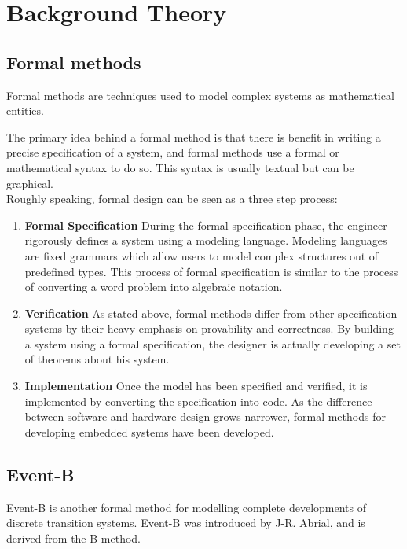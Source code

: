 \section{Background Theory}

\subsection{Formal methods}
Formal methods are techniques used to model complex systems as
mathematical entities.

The primary idea behind a formal method is that there is benefit in writing a
precise specification of a system, and formal methods use a formal or
mathematical syntax to do so. This syntax is usually textual but can be
graphical. \\

Roughly speaking, formal design can be seen as a three step process:
\begin{enumerate}
\item \textbf{Formal Specification}
During the formal specification phase, the
engineer rigorously defines a system using a modeling language.
Modeling languages are fixed grammars which allow users to model
complex structures out of predefined types. This process of formal
specification is similar to the process of converting a word problem into
algebraic notation.

  \item \textbf{Verification}
As stated above, formal methods differ from other
specification systems by their heavy emphasis on provability and
correctness. By building a system using a formal specification, the
designer is actually developing a set of theorems about his system. 

  \item \textbf{Implementation}
Once the model has been specified and verified, it is implemented by converting
the specification into code. As the difference between software and hardware
design grows narrower, formal methods for developing embedded systems have been
developed. 

\end{enumerate}

\subsection{Event-B}

Event-B is another formal method for modelling complete developments of discrete
transition systems. Event-B was introduced by J-R. Abrial, and is derived from
the B method.

